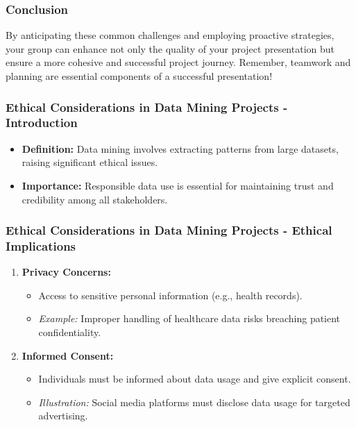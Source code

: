 \documentclass[aspectratio=169]{beamer}
\begin{document}
\begin{frame}[fragile]
  \frametitle{Conclusion}
  By anticipating these common challenges and employing proactive strategies, your group can enhance not only the quality of your project presentation but ensure a more cohesive and successful project journey. Remember, teamwork and planning are essential components of a successful presentation!
\end{frame}

\begin{frame}[fragile]
    \frametitle{Ethical Considerations in Data Mining Projects - Introduction}
    \begin{itemize}
        \item \textbf{Definition:} Data mining involves extracting patterns from large datasets, raising significant ethical issues.
        \item \textbf{Importance:} Responsible data use is essential for maintaining trust and credibility among all stakeholders.
    \end{itemize}
\end{frame}

\begin{frame}[fragile]
    \frametitle{Ethical Considerations in Data Mining Projects - Ethical Implications}
    \begin{enumerate}
        \item \textbf{Privacy Concerns:}
            \begin{itemize}
                \item Access to sensitive personal information (e.g., health records).
                \item \textit{Example:} Improper handling of healthcare data risks breaching patient confidentiality.
            \end{itemize}
        \item \textbf{Informed Consent:}
            \begin{itemize}
                \item Individuals must be informed about data usage and give explicit consent.
                \item \textit{Illustration:} Social media platforms must disclose data usage for targeted advertising.
            \end{itemize}
    \end{enumerate}
\end{frame}
\end{document}
